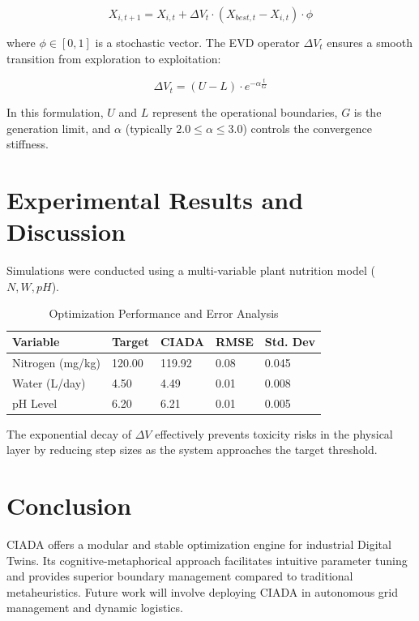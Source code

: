 \documentclass[twocolumn, 10pt]{article}
\begin{document}
\begin{equation}
    X_{i,t+1} = X_{i,t} + \Delta V_t \cdot (X_{best,t} - X_{i,t}) \cdot \phi
\end{equation}

where $\phi \in [0, 1]$ is a stochastic vector. The EVD operator $\Delta V_t$ ensures a smooth transition from exploration to exploitation:

\begin{equation}
    \Delta V_t = (U - L) \cdot e^{-\alpha \frac{t}{G}}
\end{equation}

In this formulation, $U$ and $L$ represent the operational boundaries, $G$ is the generation limit, and $\alpha$ (typically $2.0 \leq \alpha \leq 3.0$) controls the convergence stiffness.

\section{Experimental Results and Discussion}
Simulations were conducted using a multi-variable plant nutrition model ($N, W, pH$). 

\begin{table}[h]
\centering
\caption{Optimization Performance and Error Analysis}
\label{tab:results}
\begin{tabular}{@{}lllll@{}}
\toprule
\textbf{Variable} & \textbf{Target} & \textbf{CIADA} & \textbf{RMSE} & \textbf{Std. Dev} \\ \midrule
Nitrogen (mg/kg)  & 120.00          & 119.92         & 0.08          & 0.045             \\
Water (L/day)     & 4.50            & 4.49           & 0.01          & 0.008             \\
pH Level          & 6.20            & 6.21           & 0.01          & 0.005             \\ \bottomrule
\end{tabular}
\end{table}

The exponential decay of $\Delta V$ effectively prevents toxicity risks in the physical layer by reducing step sizes as the system approaches the target threshold.

\section{Conclusion}
CIADA offers a modular and stable optimization engine for industrial Digital Twins. Its cognitive-metaphorical approach facilitates intuitive parameter tuning and provides superior boundary management compared to traditional metaheuristics. Future work will involve deploying CIADA in autonomous grid management and dynamic logistics.
\end{document}
